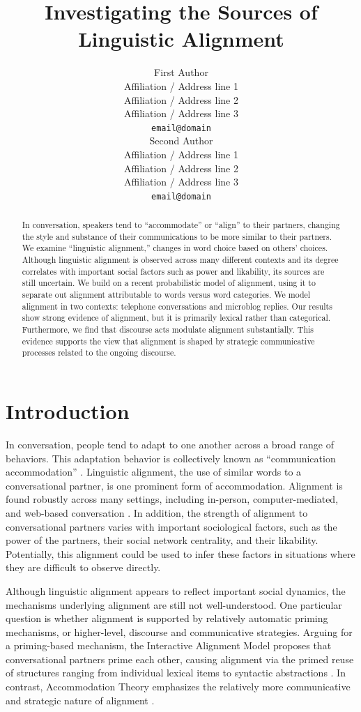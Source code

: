 \documentclass[11pt]{article}
\title{Investigating the Sources of Linguistic Alignment}
\author{First Author \\
  Affiliation / Address line 1 \\
  Affiliation / Address line 2 \\
  Affiliation / Address line 3 \\
  {\tt email@domain} \\\And
  Second Author \\
  Affiliation / Address line 1 \\
  Affiliation / Address line 2 \\
  Affiliation / Address line 3 \\
  {\tt email@domain} \\}
\date{}
\begin{document}
\maketitle

\begin{abstract}
In conversation, speakers tend to ``accommodate'' or ``align'' to their partners, changing the style and substance of their communications to be more similar to their partners. We examine ``linguistic alignment,'' changes in word choice based on others' choices. Although linguistic alignment is observed across many different contexts and its degree correlates with important social factors such as power and likability, its sources are still uncertain.
We build on a recent probabilistic model of alignment, using it to separate out alignment attributable to words versus word categories. We model alignment in two contexts: telephone conversations and microblog replies.
Our results show strong evidence of alignment, but it is primarily lexical rather than categorical. Furthermore, we find that discourse acts modulate alignment substantially. This evidence supports the view that alignment is shaped by strategic communicative processes related to the ongoing discourse.
\end{abstract}

\section{Introduction}

In conversation, people tend to adapt to one another across a broad range of behaviors. This adaptation behavior is collectively known as ``communication accommodation'' \cite{GilesCouplandCoupland1991}. Linguistic alignment, the use of similar words to a conversational partner, is one prominent form of accommodation. Alignment is found robustly across many settings, including in-person, computer-mediated, and web-based conversation \cite{DNMEtAl2012,GilesSchererTaylor1979,NiederhofferPennebaker2002}. In addition, the strength of alignment to conversational partners varies with important sociological factors, such as the power of the partners, their social network centrality, and their likability. Potentially, this alignment could be used to infer these factors in situations where they are difficult to observe directly.

Although linguistic alignment appears to reflect important social dynamics, the mechanisms underlying alignment are still not well-understood. One particular question is whether alignment is supported by relatively automatic priming mechanisms, or higher-level, discourse and communicative strategies. Arguing for a priming-based mechanism, the Interactive Alignment Model proposes that conversational partners prime each other, causing alignment via the primed reuse of structures ranging from individual lexical items to syntactic abstractions  \cite{PickeringGarrod2004}. In contrast, Accommodation Theory emphasizes the relatively more communicative and strategic nature of alignment \cite{GilesCouplandCoupland1991}.
\end{document}
